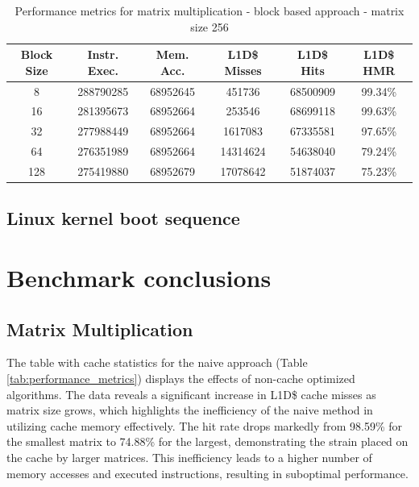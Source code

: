 \begin{center}
\begin{table}[!htbp]
\centering
\begin{tabular}{|c|c|c|c|c|c|}
\hline
\textbf{Block Size} & \textbf{Instr. Exec.} & \textbf{Mem. Acc.} & \textbf{L1D\$ Misses} & \textbf{L1D\$ Hits} & \textbf{L1D\$ HMR} \\ \hline
8 & 288790285 & 68952645 & 451736 & 68500909 & 99.34\% \\ \hline
16 & 281395673 & 68952664 & 253546 & 68699118 & 99.63\% \\ \hline
32 & 277988449 & 68952664 & 1617083 & 67335581 & 97.65\% \\ \hline
64 & 276351989 & 68952664 & 14314624 & 54638040 & 79.24\% \\ \hline
128 & 275419880 & 68952679 & 17078642 & 51874037 & 75.23\% \\ \hline
\end{tabular}
\caption{Performance metrics for matrix multiplication - block based approach - matrix size 256}
\label{tab:performance_metrics_256}
\end{table}
\end{center}

\subsection{Linux kernel boot sequence}

\section{Benchmark conclusions}

\subsection*{Matrix Multiplication}

The table with cache statistics for the naive approach (Table \ref{tab:performance_metrics}) displays the effects of non-cache optimized algorithms. The data reveals a significant
increase in L1D\$ cache misses as matrix size grows, which highlights the inefficiency of the naive method in utilizing cache memory effectively. The hit rate drops markedly from
98.59\% for the smallest matrix to 74.88\% for the largest, demonstrating the strain placed on the cache by larger matrices. This inefficiency leads to a higher number of memory
accesses and executed instructions, resulting in suboptimal performance.

